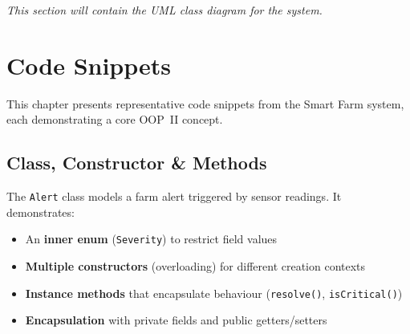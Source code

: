 \documentclass[12pt, a4paper]{report}
\begin{document}

\textit{This section will contain the UML class diagram for the system.}


\chapter{Code Snippets}

This chapter presents representative code snippets from the Smart Farm system, each demonstrating a core OOP~II concept.


\section{Class, Constructor \& Methods}

The \texttt{Alert} class models a farm alert triggered by sensor readings. It demonstrates:

\begin{itemize}[noitemsep]
    \item An \textbf{inner enum} (\texttt{Severity}) to restrict field values
    \item \textbf{Multiple constructors} (overloading) for different creation contexts
    \item \textbf{Instance methods} that encapsulate behaviour (\texttt{resolve()}, \texttt{isCritical()})
    \item \textbf{Encapsulation} with private fields and public getters/setters
\end{itemize}
\end{document}
